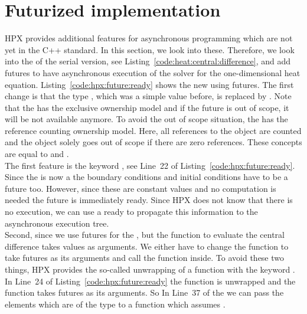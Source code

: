 \section{Futurized implementation}
\label{heatequation:async}
HPX provides additional features for asynchronous programming which are not yet in the C++ standard. In this section, we look into these. Therefore, we look into the  of the serial version, see Listing~\ref{code:heat:central:difference}, and add futures to have asynchronous execution of the solver for the one-dimensional heat equation. Listing~\ref{code:hpx:future:ready} shows the new  using futures. The first change is that the type , which was a simple  value before, is replaced by . Note that the  has the exclusive ownership model and if the future is out of scope, it will be not available anymore. To avoid the out of scope situation, the  has the reference counting ownership model. Here, all references to the object are counted and the object solely goes out of scope if there are zero references. These concepts are equal to  and .\\
 
The first feature is the keyword , see Line~22 of Listing~\ref{code:hpx:future:ready}. Since the  is now a  the boundary conditions and initial conditions have to be a future too. However, since these are constant values and no computation is needed the future is immediately ready. Since HPX does not know that there is no execution, we can use a  ready to propagate this information to the asynchronous execution tree.\\

Second, since we use futures for the , but the function to evaluate the central difference  takes  values as arguments. We either have to change the function to take futures as its arguments and call the  function inside. To avoid these two things, HPX provides the so-called unwrapping of a function with the keyword . In Line~24 of Listing~\ref{code:hpx:future:ready} the function  is unwrapped and the function  takes futures as its arguments. So In Line~37 of the  we can pass the  elements which are of the type  to a function which assumes .\\

